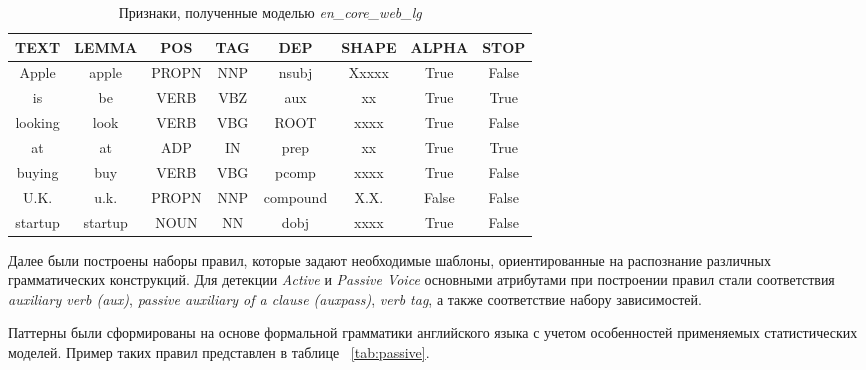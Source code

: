\begin{table}
\centering
\caption{\label{tab:spacy-example-attr}Признаки, полученные моделью \emph{en\_core\_web\_lg}}
\begin{tabular}{@{}cccccccc@{}}
\toprule
TEXT    & LEMMA   & POS   & TAG & DEP      & SHAPE & ALPHA & STOP  \\ \midrule
Apple   & apple   & PROPN & NNP & nsubj    & Xxxxx & True  & False \\
is      & be      & VERB  & VBZ & aux      & xx    & True  & True  \\
looking & look    & VERB  & VBG & ROOT     & xxxx  & True  & False \\
at      & at      & ADP   & IN  & prep     & xx    & True  & True  \\
buying  & buy     & VERB  & VBG & pcomp    & xxxx  & True  & False \\
U.K.    & u.k.    & PROPN & NNP & compound & X.X.  & False & False \\
startup & startup & NOUN  & NN  & dobj     & xxxx  & True  & False \\ \bottomrule
\end{tabular}
\end{table}

Далее были построены наборы правил, которые задают необходимые шаблоны, ориентированные на распознание различных грамматических конструкций. Для детекции \emph{Active} и \emph{Passive Voice} основными атрибутами при построении правил стали соответствия \emph{auxiliary verb (aux)}, \emph{passive auxiliary of a clause (auxpass)}, \emph{verb tag}, а также соответствие набору зависимостей.

Паттерны были сформированы на основе формальной грамматики английского языка с учетом особенностей применяемых статистических моделей. Пример таких правил представлен в таблице ~\ref{tab:passive}.

